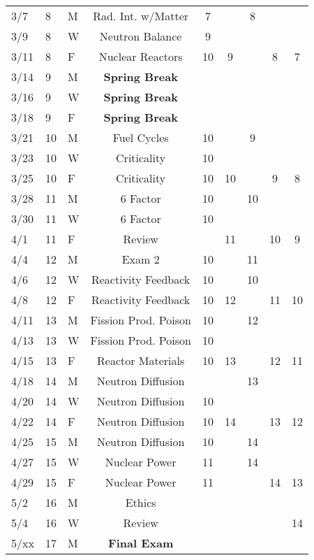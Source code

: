 \documentclass[11pt, a4paper]{article}
\begin{document}
\begin{table}[h]
\begin{center}
\begin{tabular}{lllcccccc}
3/7 & 8 & M & Rad. Int. w/Matter     & 7 &  & 8 &  &  \\
3/9 & 8 & W & Neutron Balance         & 9 &   &  &  &  \\
3/11 & 8 & F & Nuclear Reactors        & 10 & 9 &  & 8 & 7 \\
3/14 & 9 & M & \textbf{Spring Break}&  &  &  &  &  \\
3/16 & 9 & W & \textbf{Spring Break}&  &  &  &  &  \\
3/18 & 9 & F & \textbf{Spring Break}&  &  &  &  &  \\
3/21 & 10 & M & Fuel Cycles          & 10 &  & 9 &  &  \\
3/23 & 10 & W & Criticality          & 10 &  &  &  &  \\
3/25 & 10 & F & Criticality          & 10 & 10 &  & 9 & 8 \\
3/28 & 11 & M & 6 Factor            & 10 &  & 10 &  &  \\
3/30 & 11 & W & 6 Factor            & 10 &  &  &  & \\
4/1 & 11 & F & Review  &  &  11 &  & 10 & 9 \\
4/4 & 12 & M & Exam 2 &  10  &   & 11 &  &  \\
4/6 & 12 & W & Reactivity Feedback & 10  &  & 10 &  &  \\
4/8 & 12 & F & Reactivity Feedback & 10 & 12 &  & 11 & 10 \\
4/11 & 13 & M & Fission Prod. Poison & 10 &  & 12 & &  \\
4/13 & 13 & W & Fission Prod. Poison & 10 &  &  &  &  \\
4/15 & 13 & F & Reactor Materials    & 10 & 13 &  & 12 & 11 \\
4/18 & 14 & M & Neutron Diffusion    &  &  & 13  &  &  \\
4/20 & 14 & W & Neutron Diffusion    & 10 & &  &  & \\
4/22 & 14 & F & Neutron Diffusion    & 10 & 14 &  & 13 & 12 \\
4/25 & 15 & M & Neutron Diffusion    & 10  &  & 14 & &  \\
4/27 & 15 & W & Nuclear Power        & 11 &  & 14 &  &  \\
4/29 & 15 & F & Nuclear Power        & 11 &  &  & 14 & 13 \\
5/2 & 16 & M & Ethics                &  &  & &  &      \\
5/4 & 16 & W &  Review               &  &  &  &  &  14 \\
5/xx & 17 & M & \textbf{Final Exam}  &  &  &  &  &     \\
\end{tabular}
\end{center}
\end{table}
\FloatBarrier



\end{document}
